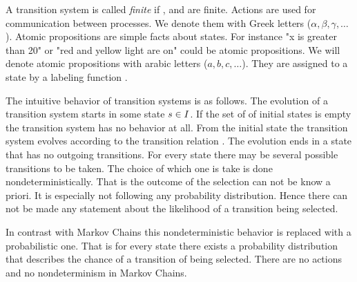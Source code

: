 \documentclass[preview]{standalone}
\begin{document}
A transition system is called \emph{finite} if \states, \atomicprops and  are finite. Actions are used for communication between processes. We denote them with Greek letters ($\alpha, \beta, \gamma, \dots$). Atomic propositions are simple facts about states. For instance "x is greater than 20" or "red and yellow light are on" could be atomic propositions. We will denote atomic propositions with arabic letters ($a,b,c,\dots$). They are assigned to a state by a labeling function .

The intuitive behavior of transition systems is as follows. The evolution of a transition system starts in some state ${s} \in {I}$. If the set of \initstates of initial states is empty the transition system has no behavior at all. From the initial state the transition system evolves according to the transition relation \transitionrel. The evolution ends in a state that has no outgoing transitions. For every state there may be several possible transitions to be taken. The choice of which one is take is done nondeterministically. That is the outcome of the selection can not be know a priori. It is especially not following any probability distribution. Hence there can not be made any statement about the likelihood of a transition being selected.

In contrast with Markov Chains this nondeterministic behavior is replaced with a probabilistic one. That is for every state there exists a probability distribution that describes the chance of a transition of being selected. There are no actions and no nondeterminism in Markov Chains.
%
\end{document}
